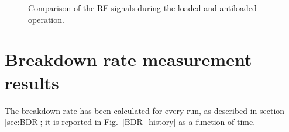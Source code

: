 \begin{figure}[h]
\centering
\caption{Comparison of the RF signals during the loaded and antiloaded operation.}
 \label{RF_load}
 \end{figure}


\section[Breakdown rate measurement results]{Breakdown rate measurement results}

The breakdown rate has been calculated for every run, as described in section \ref{sec:BDR}; it is reported in Fig.~\ref{BDR_history} as a function of time. 

